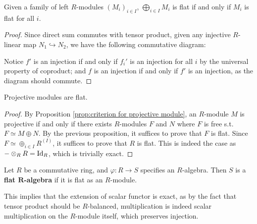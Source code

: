 \documentclass{article}
\begin{document}
\begin{proposition}
    Given a family of left $R$-modules $(M_i)_{i \in I}$, $\bigoplus_{i\in I} M_i$ is flat if and only if $M_i$ is flat for all $i$.
\end{proposition}

\begin{proof}
    Since direct sum commutes with tensor product, given any injective $R$-linear map $N_1 \hookrightarrow N_2$, we have the following commutative diagram:
    \begin{figure}[htbp]
        \centering
    \end{figure}
    Notice $f'$ is an injection if and only if $f_i'$ is an injection for all $i$ by the universal property of coproduct; and $f$ is an injection if and only if $f'$ is an injection, as the diagram should commute.
\end{proof}

\begin{corollary}
    Projective modules are flat.
\end{corollary}

\begin{proof}
    By Proposition \ref{prop:criterion for projective module}, an $R$-module $M$ is projective if and only if there exists $R$-modules $F$ and $N$ where $F$ is free s.t. $F \simeq M \oplus N$. By the previous proposition, it suffices to prove that $F$ is flat. Since $F \simeq \oplus_{i \in I} R^{(I)}$, it suffices to prove that $R$ is flat. This is indeed the case as $- \otimes_R R = \mathrm{Id}_R$, which is trivially exact.
\end{proof}

\begin{definition}
    Let $R$ be a commutative ring, and $\varphi: R \to S$ specifies an $R$-algebra. Then $S$ is a \textbf{flat $\mathbf{R}$-algebra} if it is flat as an $R$-module. 
\end{definition}

\begin{remark}
    This implies that the extension of scalar functor is exact, as by the fact that tensor product should be $R$-balanced, multiplication is indeed scalar multiplication on the $R$-module itself, which preserves injection. 
\end{remark}
\end{document}
